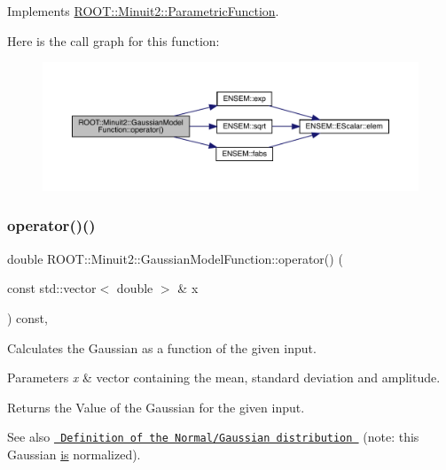 Implements \mbox{\hyperlink{classROOT_1_1Minuit2_1_1ParametricFunction_a953426fa51c84cdef3eba24274131806}{R\+O\+O\+T\+::\+Minuit2\+::\+Parametric\+Function}}.

Here is the call graph for this function\+:
\nopagebreak
\begin{figure}[H]
\begin{center}
\leavevmode
\includegraphics[width=350pt]{d4/df6/classROOT_1_1Minuit2_1_1GaussianModelFunction_af4102c5eecd496d63c5592f7519248ce_cgraph}
\end{center}
\end{figure}
\mbox{\label{classROOT_1_1Minuit2_1_1GaussianModelFunction_af4102c5eecd496d63c5592f7519248ce}} 
\subsubsection{\texorpdfstring{operator()()}{operator()()}\hspace{0.1cm}{\footnotesize\ttfamily [2/4]}}
{\footnotesize\ttfamily double R\+O\+O\+T\+::\+Minuit2\+::\+Gaussian\+Model\+Function\+::operator() (\begin{DoxyParamCaption}\item[{const std\+::vector$<$ double $>$ \&}]{x }\end{DoxyParamCaption}) const\hspace{0.3cm}{\ttfamily [inline]}, {\ttfamily [virtual]}}

Calculates the Gaussian as a function of the given input.


\begin{DoxyParams}{Parameters}
{\em x} & vector containing the mean, standard deviation and amplitude.\\
\hline
\end{DoxyParams}
\begin{DoxyReturn}{Returns}
the Value of the Gaussian for the given input.
\end{DoxyReturn}
\begin{DoxySeeAlso}{See also}
\href{http://mathworld.wolfram.com/NormalDistribution.html}{\texttt{ Definition of the Normal/\+Gaussian distribution }} (note\+: this Gaussian \mbox{\hyperlink{x_8cc_a81abbbdef81e25584a2eab888e643d3d}{is}} normalized). 
\end{DoxySeeAlso}


